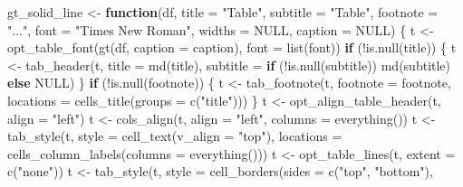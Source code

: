 \documentclass[
]{article}
\newenvironment{Shaded}{\begin{snugshade}}{\end{snugshade}}
\newcommand{\AttributeTok}[1]{\textcolor[rgb]{0.77,0.63,0.00}{#1}}
\newcommand{\ConstantTok}[1]{\textcolor[rgb]{0.00,0.00,0.00}{#1}}
\newcommand{\ControlFlowTok}[1]{\textcolor[rgb]{0.13,0.29,0.53}{\textbf{#1}}}
\newcommand{\FunctionTok}[1]{\textcolor[rgb]{0.00,0.00,0.00}{#1}}
\newcommand{\NormalTok}[1]{#1}
\newcommand{\OtherTok}[1]{\textcolor[rgb]{0.56,0.35,0.01}{#1}}
\newcommand{\SpecialCharTok}[1]{\textcolor[rgb]{0.00,0.00,0.00}{#1}}
\newcommand{\StringTok}[1]{\textcolor[rgb]{0.31,0.60,0.02}{#1}}
\begin{document}
\begin{Shaded}
\begin{Highlighting}[]
\NormalTok{gt\_solid\_line }\OtherTok{\textless{}{-}} 
  \ControlFlowTok{function}\NormalTok{(df, }\AttributeTok{title =} \StringTok{"Table"}\NormalTok{, }\AttributeTok{subtitle =} \StringTok{"Table"}\NormalTok{, }\AttributeTok{footnote =} \StringTok{"..."}\NormalTok{,}
    \AttributeTok{font =} \StringTok{"Times New Roman"}\NormalTok{, }\AttributeTok{widths =} \ConstantTok{NULL}\NormalTok{, }\AttributeTok{caption =} \ConstantTok{NULL}\NormalTok{)}
\NormalTok{  \{}
\NormalTok{    t }\OtherTok{\textless{}{-}} \FunctionTok{opt\_table\_font}\NormalTok{(}\FunctionTok{gt}\NormalTok{(df, }\AttributeTok{caption =}\NormalTok{ caption), }\AttributeTok{font =} \FunctionTok{list}\NormalTok{(font))}
    \ControlFlowTok{if}\NormalTok{ (}\SpecialCharTok{!}\FunctionTok{is.null}\NormalTok{(title)) \{}
\NormalTok{      t }\OtherTok{\textless{}{-}} \FunctionTok{tab\_header}\NormalTok{(t, }\AttributeTok{title =} \FunctionTok{md}\NormalTok{(title),}
        \AttributeTok{subtitle =} \ControlFlowTok{if}\NormalTok{ (}\SpecialCharTok{!}\FunctionTok{is.null}\NormalTok{(subtitle)) }\FunctionTok{md}\NormalTok{(subtitle) }\ControlFlowTok{else} \ConstantTok{NULL}\NormalTok{)}
\NormalTok{    \}}
    \ControlFlowTok{if}\NormalTok{ (}\SpecialCharTok{!}\FunctionTok{is.null}\NormalTok{(footnote)) \{}
\NormalTok{      t }\OtherTok{\textless{}{-}} \FunctionTok{tab\_footnote}\NormalTok{(t, }\AttributeTok{footnote =}\NormalTok{ footnote,}
        \AttributeTok{locations =} \FunctionTok{cells\_title}\NormalTok{(}\AttributeTok{groups =} \FunctionTok{c}\NormalTok{(}\StringTok{"title"}\NormalTok{)))}
\NormalTok{    \}}
\NormalTok{    t }\OtherTok{\textless{}{-}} \FunctionTok{opt\_align\_table\_header}\NormalTok{(t, }\AttributeTok{align =} \StringTok{"left"}\NormalTok{)}
\NormalTok{    t }\OtherTok{\textless{}{-}} \FunctionTok{cols\_align}\NormalTok{(t, }\AttributeTok{align =} \StringTok{"left"}\NormalTok{,}
      \AttributeTok{columns =} \FunctionTok{everything}\NormalTok{()) }
\NormalTok{    t }\OtherTok{\textless{}{-}} \FunctionTok{tab\_style}\NormalTok{(t, }\AttributeTok{style =} \FunctionTok{cell\_text}\NormalTok{(}\AttributeTok{v\_align =} \StringTok{"top"}\NormalTok{),}
      \AttributeTok{locations =} \FunctionTok{cells\_column\_labels}\NormalTok{(}\AttributeTok{columns =} \FunctionTok{everything}\NormalTok{())) }
\NormalTok{    t }\OtherTok{\textless{}{-}} \FunctionTok{opt\_table\_lines}\NormalTok{(t, }\AttributeTok{extent =} \FunctionTok{c}\NormalTok{(}\StringTok{"none"}\NormalTok{))}
\NormalTok{    t }\OtherTok{\textless{}{-}} \FunctionTok{tab\_style}\NormalTok{(t, }\AttributeTok{style =} \FunctionTok{cell\_borders}\NormalTok{(}\AttributeTok{sides =} \FunctionTok{c}\NormalTok{(}\StringTok{"top"}\NormalTok{, }\StringTok{"bottom"}\NormalTok{),}

\end{Highlighting}
\end{Shaded}
\end{document}
